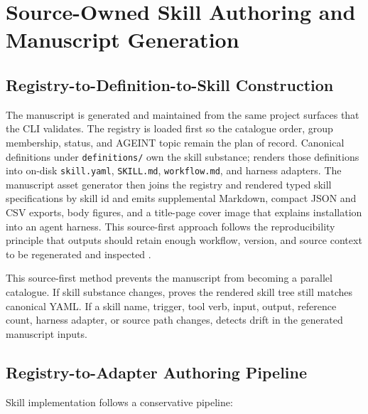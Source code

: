 \documentclass[
]{article}
\begin{document}
\newpage

\section{Source-Owned Skill Authoring and Manuscript
Generation}\label{sec:methods}

\subsection{Registry-to-Definition-to-Skill
Construction}\label{registry-to-definition-to-skill-construction}

The manuscript is generated and maintained from the same project
surfaces that the CLI validates. The registry is loaded first so the
catalogue order, group membership, status, and AGEINT topic remain the
plan of record. Canonical definitions under \texttt{definitions/} own
the skill substance;  renders those
definitions into on-disk \texttt{skill.yaml}, \texttt{SKILL.md},
\texttt{workflow.md}, and harness adapters. The manuscript asset
generator then joins the registry and rendered typed skill
specifications by skill id and emits supplemental Markdown, compact JSON
and CSV exports, body figures, and a title-page cover image that
explains installation into an agent harness. This source-first approach
follows the reproducibility principle that outputs should retain enough
workflow, version, and source context to be regenerated and inspected
\citep{sandve2013reproducible, wilkinson2016fair}.

This source-first method prevents the manuscript from becoming a
parallel catalogue. If skill substance changes,
 proves the rendered skill
tree still matches canonical YAML. If a skill name, trigger, tool verb,
input, output, reference count, harness adapter, or source path changes,
 detects drift in the
generated manuscript inputs.

\subsection{Registry-to-Adapter Authoring
Pipeline}\label{registry-to-adapter-authoring-pipeline}

Skill implementation follows a conservative pipeline:
\end{document}
